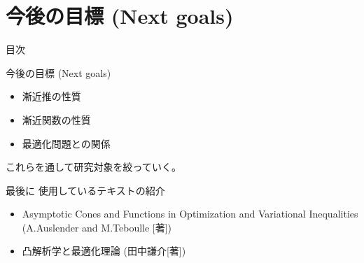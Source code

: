 \documentclass[aspectratio=169, dvipdfmx, 11pt]{beamer} %
\begin{document}
\section{今後の目標 (Next goals) }
\begin{frame}{目次}
    \tableofcontents[currentsection]
\end{frame}

\begin{frame}{今後の目標 (Next goals) }
    \begin{itemize}
    \item 漸近推の性質
    \item 漸近関数の性質
    \item 最適化問題との関係
    \end{itemize}

    これらを通して研究対象を絞っていく。
\end{frame}

\begin{frame}{最後に }
  使用しているテキストの紹介
  \begin{itemize}
  \item Asymptotic Cones and Functions in Optimization and Variational Inequalities (A.Auslender and M.Teboulle [著])
  \item 凸解析学と最適化理論 (田中謙介[著])
  \end{itemize}
\end{frame}
\end{document}

